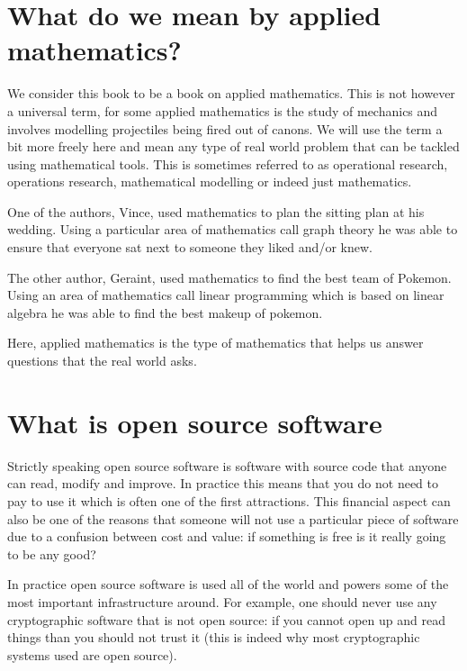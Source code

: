 \section{What do we mean by applied mathematics?}\label{sec:what-do-we-mean-by-applied-mathematics}

We consider this book to be a book on applied mathematics. This is not
however a universal term, for some applied mathematics is the study of
mechanics and involves modelling projectiles being fired out of canons.
We will use the term a bit more freely here and mean any type of real
world problem that can be tackled using mathematical tools. This is
sometimes referred to as operational research, operations research,
mathematical modelling or indeed just mathematics.

One of the authors, Vince, used mathematics to plan the sitting plan at
his wedding. Using a particular area of mathematics call graph theory he
was able to ensure that everyone sat next to someone they liked and/or
knew.

The other author, Geraint, used mathematics to find the best team of
Pokemon. Using an area of mathematics call linear programming which is
based on linear algebra he was able to find the best makeup of pokemon.

Here, applied mathematics is the type of mathematics that helps us
answer questions that the real world asks.

\section{What is open source
software}\label{sec:what-is-open-source-software}

Strictly speaking open source software is software with source code that
anyone can read, modify and improve. In practice this means that you do
not need to pay to use it which is often one of the first attractions.
This financial aspect can also be one of the reasons that someone will
not use a particular piece of software due to a confusion between cost
and value: if something is free is it really going to be any good?

In practice open source software is used all of the world and powers
some of the most important infrastructure around. For example, one
should never use any cryptographic software that is not open source: if
you cannot open up and read things than you should not trust it (this is
indeed why most cryptographic systems used are open source).

